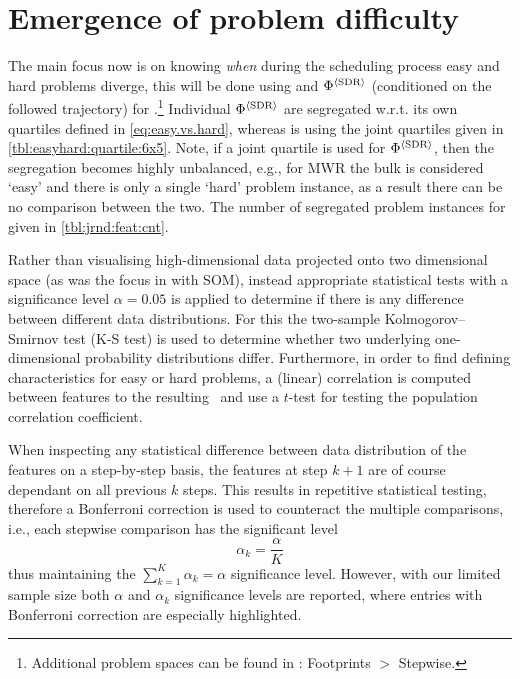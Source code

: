 \clearpage
\section{Emergence of problem difficulty}\label{sec:diff:stepwise}


The main focus now is on knowing \emph{when} during the scheduling process easy 
and hard problems diverge, this will be done using  and 
$\Phi^{\langle \text{SDR} \rangle}$ (conditioned on the followed trajectory) for 
.\footnote{Additional problem spaces can be
    found in \shiny: Footprints $>$ Stepwise.}
Individual $\Phi^{\langle \text{SDR} \rangle}$ are segregated w.r.t. its own quartiles defined 
in \cref{eq:easy.vs.hard}, whereas  is using the joint quartiles 
given in \cref{tbl:easyhard:quartile:6x5}. 
Note, if a joint quartile is used for $\Phi^{\langle \text{SDR} \rangle}$, then the segregation 
becomes highly unbalanced, e.g., for MWR the bulk is considered `easy' and 
there is only a single `hard' problem instance, as a result there 
can be no comparison between the two. 
The number of segregated problem instances for given in 
\cref{tbl:jrnd:feat:cnt}.

Rather than visualising high-dimensional data projected onto two dimensional 
space (as was the focus in \cite{SmithMilesLion5} with SOM), 
instead appropriate statistical tests with a significance level $\alpha=0.05$ 
is applied to determine if there is any difference between different data 
distributions. 
For this the two-sample Kolmogorov–Smirnov test (K-S test) is used to determine 
whether two underlying one-dimensional probability distributions differ. 
Furthermore, in order to find defining characteristics for easy or hard 
problems, a (linear) correlation is computed between features to the resulting 
\namerho\ and use a $t$-test for testing the population correlation 
coefficient. 

When inspecting any statistical difference between data distribution of 
the features on a step-by-step basis, the features at step $k+1$ are of course 
dependant on all previous $k$ steps. This results in repetitive statistical 
testing, therefore a Bonferroni correction is used to counteract the multiple 
comparisons, i.e., each stepwise comparison has the significant level
\begin{equation}
\alpha_k=\frac{\alpha}{K}
\end{equation} 
thus maintaining the $\sum_{k=1}^K\alpha_k=\alpha$ significance level. 
However, with our limited sample size both $\alpha$ and $\alpha_k$ significance 
levels are reported, where entries with Bonferroni correction are especially 
highlighted.

